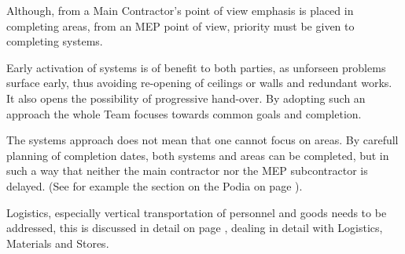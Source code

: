Although, from a Main Contractor's point of view emphasis is placed in completing areas, from an MEP point of view, priority must be given to completing systems. 

Early activation of systems is of benefit to both parties, as unforseen problems surface early,  thus avoiding re-opening of ceilings or walls and redundant works. It also opens the possibility of progressive hand-over.  By adopting such an approach the whole Team focuses towards common goals and completion.

The systems approach does not mean that one cannot focus on areas. By carefull planning of completion dates, both systems and areas can be completed, but in such a way that neither the main contractor nor the MEP subcontractor is delayed. (See for example  the section on the  Podia on page  \pageref{sec:podium}).

Logistics, especially vertical transportation of personnel and goods needs to be addressed, this is discussed in detail on page \pageref{sec:logistics}, dealing in detail with Logistics, Materials and Stores.
